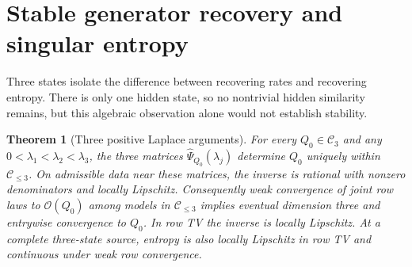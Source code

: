 \documentclass[aps,pre,onecolumn,11pt,longbibliography,notitlepage]{revtex4-2}
\newtheorem{theorem}{Theorem}
\newcommand{\1}{\mathbf 1}
\newcommand{\C}{\mathcal C}
\newcommand{\Obs}{\mathcal O}
\begin{document}
\section{Stable generator recovery and singular entropy}\label{sec:three}
Three states isolate the difference between recovering rates and recovering entropy. There is only one hidden state, so no nontrivial hidden similarity remains, but this algebraic observation alone would not establish stability.

\begin{theorem}[Three positive Laplace arguments]\label{thm:inverse}
For every $Q_0\in\C_3$ and any $0<\lambda_1<\lambda_2<\lambda_3$, the three matrices $\widehat\Psi_{Q_0}(\lambda_j)$ determine $Q_0$ uniquely within $\C_{\le3}$. On admissible data near these matrices, the inverse is rational with nonzero denominators and locally Lipschitz. Consequently weak convergence of joint row laws to $\Obs(Q_0)$ among models in $\C_{\le3}$ implies eventual dimension three and entrywise convergence to $Q_0$. In row TV the inverse is locally Lipschitz. At a complete three-state source, entropy is also locally Lipschitz in row TV and continuous under weak row convergence.
\end{theorem}
\end{document}
